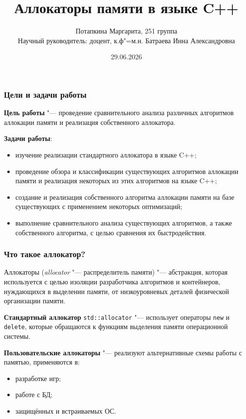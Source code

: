 \documentclass{beamer}
\begin{document}
\author{Потапкина Маргарита, 251 группа \\ Научный руководитель: доцент, к.ф"=м.н. Батраева Инна Александровна}
\title{Аллокаторы памяти в языке C++}
\date{29.06.2026}
\maketitle


\begin{frame}[plain]
\frametitle{Цели и задачи работы}
\justifying 
\textbf{Цель работы} "--- проведение сравнительного анализа различных алгоритмов аллокации памяти и реализация собственного аллокатора. 

\textbf{Задачи работы}:
\begin{itemize}
	\item изучение реализации стандартного аллокатора в языке C++;
	\item проведение обзора и классификации существующих алгоритмов аллокации памяти и реализация некоторых из этих алгоритмов на языке C++;
	\item создание и реализация собственного алгоритма аллокации памяти на базе существующих с применением некоторых оптимизаций;
	\item выполнение сравнительного анализа существующих алгоритмов, а также собственного алгоритма, с целью сравнения их быстродействия.
\end{itemize}
\end{frame}

\begin{frame}[plain]
\frametitle{Что такое аллокатор?}
\justifying
\begin{block}{}
Аллокаторы (\textit{allocator} "--- распределитель памяти) "--- абстракция, которая используется с целью изоляции разработчика алгоритмов и контейнеров, нуждающихся в выделении памяти, от низкоуровневых деталей физической организации памяти. 
\end{block}

\textbf{Стандартный	аллокатор} \texttt{std::allocator} "--- использует операторы \texttt{new} и \texttt{delete}, которые обращаются к функциям выделения памяти операционной системы.

\textbf{Пользовательские аллокаторы} "--- реализуют альтернативные схемы работы с памятью, применяются в:

\begin{itemize}
	\item разработке игр;
	\item работе с БД;
	\item защищённых и встраиваемых ОС.
\end{itemize}
\end{frame}
\end{document}
